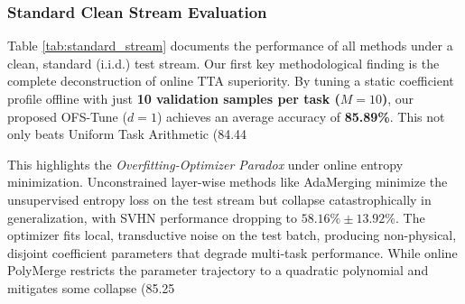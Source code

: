 \subsubsection{Standard Clean Stream Evaluation}
Table \ref{tab:standard_stream} documents the performance of all methods under a clean, standard (i.i.d.) test stream. Our first key methodological finding is the complete deconstruction of online TTA superiority. By tuning a static coefficient profile offline with just \textbf{10 validation samples per task ($M=10$)}, our proposed OFS-Tune ($d=1$) achieves an average accuracy of \textbf{85.89\%}. This not only beats Uniform Task Arithmetic (84.44%

This highlights the \emph{Overfitting-Optimizer Paradox} under online entropy minimization. Unconstrained layer-wise methods like AdaMerging minimize the unsupervised entropy loss on the test stream but collapse catastrophically in generalization, with SVHN performance dropping to $58.16\% \pm 13.92\%$. The optimizer fits local, transductive noise on the test batch, producing non-physical, disjoint coefficient parameters that degrade multi-task performance. While online PolyMerge restricts the parameter trajectory to a quadratic polynomial and mitigates some collapse (85.25%


